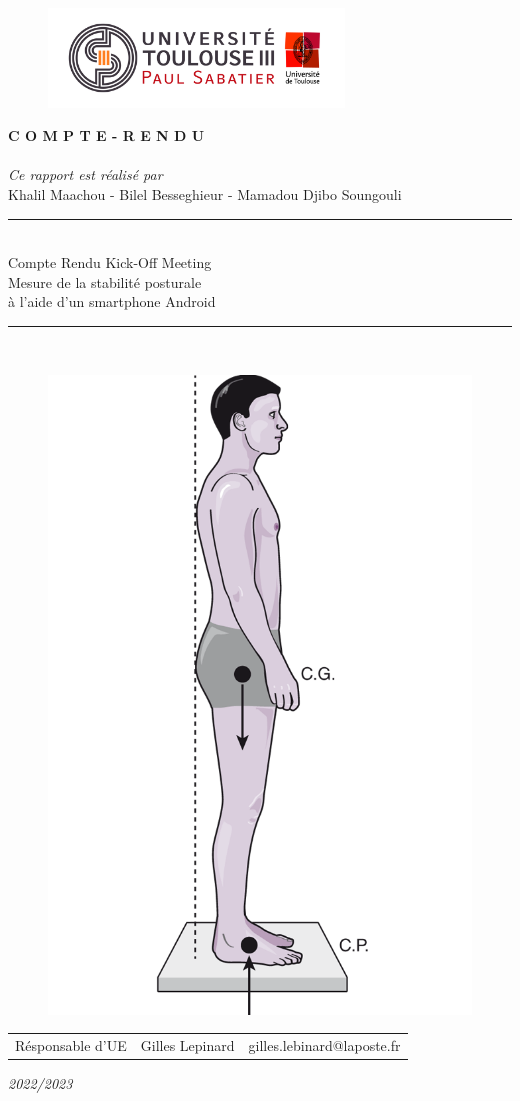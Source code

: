 \documentclass[12pt]{article}
\begin{document}
\thispagestyle{empty}
    \begin{center}
        \begin{figure}[h]
            \centering
            \includegraphics[width=0.7\textwidth]{Logo_UT3.jpg}
        \end{figure}
        \Huge \textbf{C O M P T E - R E N D U} \normalsize\\\vfill
        \emph{\\Ce rapport est réalisé par}\\
        \Large Khalil Maachou - Bilel Besseghieur - Mamadou Djibo Soungouli \\
        \rule{0.8\textwidth}{2pt}\\
        \huge{}\selectfont Compte Rendu Kick-Off Meeting\\
        \LARGE Mesure de la stabilité posturale \\ à l'aide d'un smartphone Android\\
        \rule{0.8\textwidth}{2pt}\\
        \begin{figure}[h]
            \centering
            \includegraphics[height=0.3\textwidth]{Posture-et-equilibre1.png}
        \end{figure}
    \end{center}
    \begin{center}
        \begin{tabular}{lll}
            
            \Large {Résponsable d'UE} & \Large Gilles Lepinard & \Large gilles.lebinard@laposte.fr
        \end{tabular}
    \end{center}
    \begin{center}
        \emph{2022/2023}
    \end{center}
\end{document}
